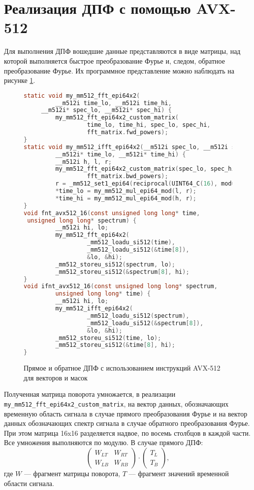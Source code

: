 \section{Реализация ДПФ с помощью AVX-512}
Для выполнения ДПФ вошедшие данные представляются в виде матрицы, над которой выполняется быстрое преобразование Фурье и, следом, обратное преобразование Фурье.
Их программное представление можно наблюдать на рисунке \ref{fig: avx512 nnt}.
\begin{figure}
\centering
\begin{lstlisting}[language=C]
static void my_mm512_fft_epi64x2(
         __m512i time_lo, __m512i time_hi,
	 __m512i* spec_lo, __m512i* spec_hi) {
         my_mm512_fft_epi64x2_custom_matrix(
                  time_lo, time_hi, spec_lo, spec_hi,
                  fft_matrix.fwd_powers);
}
static void my_mm512_ifft_epi64x2(__m512i spec_lo, __m512i spec_hi,
         __m512i* time_lo, __m512i* time_hi) {
         __m512i h, l, r;
         my_mm512_fft_epi64x2_custom_matrix(spec_lo, spec_hi, &l, &h,
                  fft_matrix.bwd_powers);
         r = _mm512_set1_epi64(reciprocal(UINT64_C(16), modulo));
         *time_lo = my_mm512_mul_epi64_mod(l, r);
         *time_hi = my_mm512_mul_epi64_mod(h, r);
}
void fnt_avx512_16(const unsigned long long* time,
 unsigned long long* spectrum) {
         __m512i hi, lo;
         my_mm512_fft_epi64x2(
                  _mm512_loadu_si512(time),
                  _mm512_loadu_si512(&time[8]),
                  &lo, &hi);
         _mm512_storeu_si512(spectrum, lo);
         _mm512_storeu_si512(&spectrum[8], hi);
}
void ifnt_avx512_16(const unsigned long long* spectrum,
         unsigned long long* time) {
         __m512i hi, lo;
         my_mm512_ifft_epi64x2(
                  _mm512_loadu_si512(spectrum),
                  _mm512_loadu_si512(&spectrum[8]),
                  &lo, &hi);
         _mm512_storeu_si512(time, lo);
         _mm512_storeu_si512(&time[8], hi);
}
\end{lstlisting}
\caption{Прямое и обратное ДПФ с использованием инструкций AVX-512 для векторов и масок}
\label{fig: avx512 nnt}
\end{figure}

Полученная матрица поворота умножается, в реализации \verb+my_mm512_fft_epi64x2_custom_matrix+, на вектор данных, обозначающих временную область сигнала в случае прямого преобразования Фурье и на вектор данных обозначающих спектр сигнала в случае обратного преобразования Фурье.
При этом матрица 16x16 разделяется надвое, по восемь столбцов в каждой части.
Все умножения выполняются по модулю.
В случае прямого ДПФ:
$$
\begin{pmatrix}
W_{LT} & W_{RT} \\
W_{LB} & W_{RB}
\end{pmatrix}
\cdot
\begin{pmatrix}
T_L \\
T_B
\end{pmatrix},
$$
где $W$ –-- фрагмент матрицы поворота, $T$ –-- фрагмент значений временной области сигнала.

